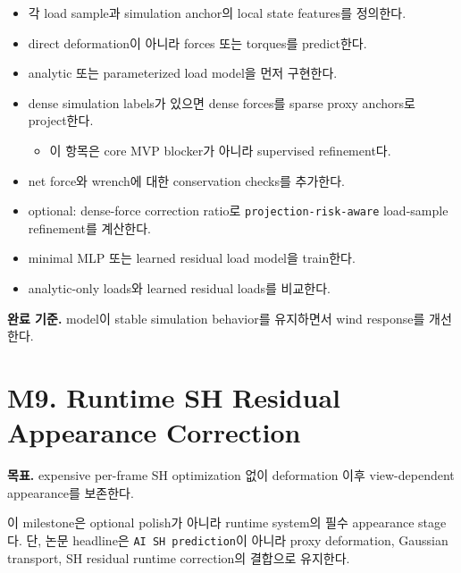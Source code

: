 \documentclass[10pt]{article}
\newcommand{\code}[1]{\texttt{#1}}
\begin{document}
\begin{itemize}
  \item 각 load sample과 simulation anchor의 local state features를 정의한다.
  \item direct deformation이 아니라 forces 또는 torques를 predict한다.
  \item analytic 또는 parameterized load model을 먼저 구현한다.
  \item dense simulation labels가 있으면 dense forces를 sparse proxy anchors로 project한다.
    \begin{itemize}
      \item 이 항목은 core MVP blocker가 아니라 supervised refinement다.
    \end{itemize}
  \item net force와 wrench에 대한 conservation checks를 추가한다.
  \item optional: dense-force correction ratio로 \code{projection-risk-aware} load-sample refinement를 계산한다.
  \item minimal MLP 또는 learned residual load model을 train한다.
  \item analytic-only loads와 learned residual loads를 비교한다.
\end{itemize}

\textbf{완료 기준.} model이 stable simulation behavior를 유지하면서 wind response를 개선한다.

\section{M9. Runtime SH Residual Appearance Correction}

\textbf{목표.} expensive per-frame SH optimization 없이 deformation 이후 view-dependent appearance를 보존한다.

이 milestone은 optional polish가 아니라 runtime system의 필수 appearance stage다. 단, 논문 headline은 \code{AI SH prediction}이 아니라 proxy deformation, Gaussian transport, SH residual runtime correction의 결합으로 유지한다.
\end{document}
